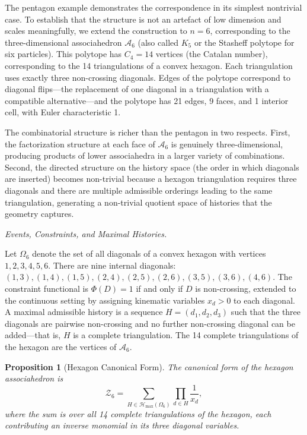 \documentclass[12pt, oneside]{amsart}
\theoremstyle{plain}
\newtheorem{proposition}[theorem]{Proposition}
\theoremstyle{definition}
\theoremstyle{remark}
\newcommand{\Phif}{\Phi}
\newcommand{\OmKS}{\Omega}
\newcommand{\Hmax}{\mathcal{H}_{\max}}
\begin{document}
The pentagon example demonstrates the correspondence in its simplest nontrivial case. To establish that the structure is not an artefact of low dimension and scales meaningfully, we extend the construction to $n = 6$, corresponding to the three-dimensional associahedron $\mathcal{A}_6$ (also called $K_5$ or the Stasheff polytope for six particles). This polytope has $C_4 = 14$ vertices (the Catalan number), corresponding to the 14 triangulations of a convex hexagon. Each triangulation uses exactly three non-crossing diagonals. Edges of the polytope correspond to diagonal flips---the replacement of one diagonal in a triangulation with a compatible alternative---and the polytope has 21 edges, 9 faces, and 1 interior cell, with Euler characteristic 1.

The combinatorial structure is richer than the pentagon in two respects. First, the factorization structure at each face of $\mathcal{A}_6$ is genuinely three-dimensional, producing products of lower associahedra in a larger variety of combinations. Second, the directed structure on the history space (the order in which diagonals are inserted) becomes non-trivial because a hexagon triangulation requires three diagonals and there are multiple admissible orderings leading to the same triangulation, generating a non-trivial quotient space of histories that the geometry captures.

\medskip\noindent\textit{Events, Constraints, and Maximal Histories.}

Let $\OmKS_6$ denote the set of all diagonals of a convex hexagon with vertices $1, 2, 3, 4, 5, 6$. There are nine internal diagonals: $(1,3), (1,4), (1,5), (2,4), (2,5), (2,6), (3,5), (3,6), (4,6)$. The constraint functional is $\Phif(D) = 1$ if and only if $D$ is non-crossing, extended to the continuous setting by assigning kinematic variables $x_d > 0$ to each diagonal. A maximal admissible history is a sequence $H = (d_1, d_2, d_3)$ such that the three diagonals are pairwise non-crossing and no further non-crossing diagonal can be added---that is, $H$ is a complete triangulation. The 14 complete triangulations of the hexagon are the vertices of $\mathcal{A}_6$.

\begin{proposition}[Hexagon Canonical Form]
\label{prop:hexagon}
The canonical form of the hexagon associahedron is
\begin{equation}
\label{eq:hexagon-Z}
  \mathcal{Z}_6 = \sum_{H \in \Hmax(\OmKS_6)} \prod_{d \in H} \frac{1}{x_d},
\end{equation}
where the sum is over all 14 complete triangulations of the hexagon, each contributing an inverse monomial in its three diagonal variables.
\end{proposition}
\end{document}
